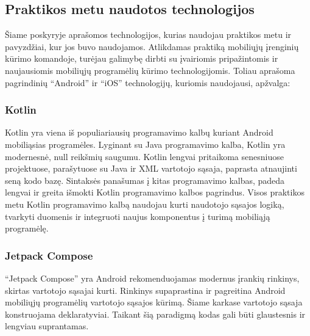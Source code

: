 \newpage

\subsection{Praktikos metu naudotos technologijos}
Šiame poskyryje aprašomos technologijos, kurias naudojau praktikos metu ir pavyzdžiai, kur jos buvo naudojamos. 
Atlikdamas praktiką mobiliųjų įrenginių kūrimo komandoje, turėjau galimybę dirbti su įvairiomis pripažintomis ir naujausiomis mobiliųjų programėlių kūrimo technologijomis. Toliau aprašoma pagrindinių \enquote{Android} ir \enquote{iOS} technologijų, kuriomis naudojausi, apžvalga:

\subsubsection{Kotlin}
Kotlin yra viena iš populiariausių programavimo kalbų kuriant Android mobiliąsias programėles. Lyginant su Java programavimo kalba, Kotlin yra modernesnė, null reikšmių saugumu. Kotlin lengvai pritaikoma senesniuose projektuose, parašytuose su Java ir XML vartotojo sąsaja, paprasta atnaujinti seną kodo bazę. Sintaksės panašumas į kitas programavimo kalbas, padeda lengvai ir greita išmokti Kotlin programavimo kalbos pagrindus.
Visos praktikos metu Kotlin programavimo kalbą naudojau kurti naudotojo sąsajos logiką, tvarkyti duomenis ir integruoti naujus komponentus į turimą mobiliąją programėlę.

\subsubsection{Jetpack Compose}

\enquote{Jetpack Compose} yra Android rekomenduojamas modernus įrankių rinkinys, skirtas vartotojo sąsajai kurti. Rinkinys supaprastina ir pagreitina Android mobiliųjų programėlių vartotojo sąsajos kūrimą. Šiame karkase vartotojo sąsaja konstruojama deklaratyviai. Taikant šią paradigmą kodas gali būti glaustesnis ir lengviau suprantamas.


